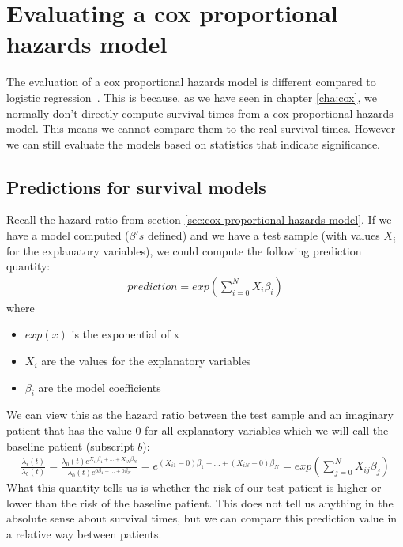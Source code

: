 \section{Evaluating a cox proportional hazards model}
\label{sec:evaluation-coxph}
The evaluation of a cox proportional hazards model is different compared to logistic regression~\cite{newson2010comparing}\cite{harrell1996tutorial}. This is because, as we have seen in chapter \ref{cha:cox}, we normally don't directly compute survival times from a cox proportional hazards model. This means we cannot compare them to the real survival times. However we can still evaluate the models based on statistics that indicate significance.

\subsection{Predictions for survival models}
Recall the hazard ratio from section \ref{sec:cox-proportional-hazards-model}. If we have a model computed ($\beta's$ defined) and we have a test sample (with values $X_{i}$ for the explanatory variables), we could compute the following prediction quantity:
\begin{equation}
\begin{split}
prediction = exp(\sum_{i=0}^{N}X_{i}\beta_{i})
\end{split}
\end{equation}
where
\begin{itemize}
	\item $exp(x)$ is the exponential of x
	\item $X_{i}$ are the values for the explanatory variables
	\item $\beta_{i}$ are the model coefficients
\end{itemize}
 We can view this as the hazard ratio between the test sample and an imaginary patient that has the value $0$ for all explanatory variables which we will call the baseline patient (subscript $b$):
 \begin{equation}
 \begin{split}
 \frac{\lambda_{i}(t)}{\lambda_{b}(t)} 
 = \frac{\lambda_{0}(t)e^{X_{i1}\beta_{1} + ... + X_{iN}\beta_{N}}}{\lambda_{0}(t)e^{0\beta_{1} + ... + 0\beta_{N}}}
 = e^{(X_{i1}-0)\beta_{1} + ... + (X_{iN}-0)\beta_{N}} = exp(\sum_{j=0}^{N}X_{ij}\beta_{j})
 \end{split}
 \end{equation}
 What this quantity tells us is whether the risk of our test patient is higher or lower than the risk of the baseline patient. This does not tell us anything in the absolute sense about survival times, but we can compare this prediction value in a relative way between patients. \\ \\
